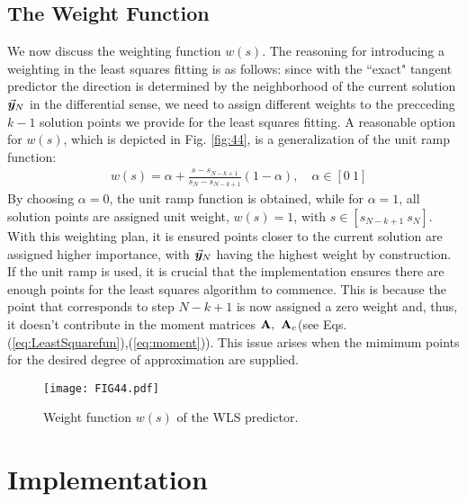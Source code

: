 \subsection{The Weight Function}\label{CH5-S2SS4}

We now discuss the weighting function $w(s)$. The reasoning for introducing a
weighting in the least squares fitting is as follows: since with
the ``exact" tangent predictor the direction is determined by the neighborhood 
of
the current solution $\vec{\bm{y}}_N$ in the differential sense, we need to assign
different weights to the precceding $k-1$ solution points we provide for the 
least squares fitting. A reasonable option for $w(s)$, which is depicted in 
Fig. \ref{fig:44}, is a generalization of the unit ramp function:
\begin{align}
	&w(s) = \alpha + \frac{s-s_{N-k+1}}{s_N-s_{N-k+1}}(1-\alpha)
	\label{eq:WeightFunction},\quad \alpha\in[0\ 1]
\end{align}
By choosing $\alpha=0$, the unit ramp function is obtained, while for
$\alpha=1$, all solution points are assigned unit weight, $w(s)=1$, with 
$s\in[s_{N-k+1}\ s_N]$.
With this weighting plan, it is
ensured points closer to the current solution are assigned higher importance,
with $\vec{\bm{y}}_N$ having the highest weight by construction. If the unit ramp is
used, it is crucial that the implementation ensures there are enough points for
the least squares algorithm to commence. This is because the point that
corresponds to step $N-k+1$ is now assigned a zero weight and, thus, it doesn't
contribute in the moment matrices $\bmat{A},\ \bmat{A}_c$(see Eqs.
(\ref{eq:LeastSquarefun}),(\ref{eq:moment})). This issue arises when the mimimum
points for the desired degree of approximation are supplied. 

\begin{figure}[t]
	\centering
	\texttt{[image: FIG44.pdf]}
	\caption{Weight function $w(s)$ of the WLS predictor.}
	\label{fig:FIG44}
\end{figure}


\section{Implementation}\label{CH5-S3}

